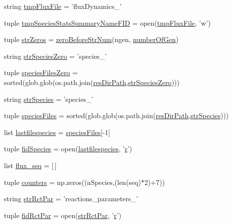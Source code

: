 \begin{DoxyCompactItemize}
\item 
string \hyperlink{a00098_a170166907641e54151f8d83d51420165}{tmp\-Flux\-File} = 'flux\-Dynamics\-\_\-'
\item 
tuple \hyperlink{a00098_a0b5b14621851cbf162c61aa936ca5f2d}{tmp\-Species\-Stats\-Summary\-Name\-F\-I\-D} = open(\hyperlink{a00098_a170166907641e54151f8d83d51420165}{tmp\-Flux\-File}, 'w')
\item 
tuple \hyperlink{a00098_abfa8fbc48a0ad5b6dff6914d6052b2b6}{str\-Zeros} = \hyperlink{a00098_ad40fd27cb36a2086a2b8d0acadd4dbc9}{zero\-Before\-Str\-Num}(ngen, \hyperlink{a00098_acd3059fa3a61438f739193dc80f23b80}{number\-Of\-Gen})
\item 
string \hyperlink{a00098_a658920d97b6df23e672e290d362033b4}{str\-Species\-Zero} = 'species\-\_\-'
\item 
tuple \hyperlink{a00098_a8c18127c32adcc1a3403749a047270e5}{species\-Files\-Zero} = sorted(glob.\-glob(os.\-path.\-join(\hyperlink{a00098_abc625ab1aeed5741a02bbaccfbee5c06}{res\-Dir\-Path},\hyperlink{a00098_a658920d97b6df23e672e290d362033b4}{str\-Species\-Zero})))
\item 
string \hyperlink{a00098_a36518d8de93502466a6d4b2e62eb7734}{str\-Species} = 'species\-\_\-'
\item 
tuple \hyperlink{a00098_ae41c9dafcdeb581e70eeb889d16c6551}{species\-Files} = sorted(glob.\-glob(os.\-path.\-join(\hyperlink{a00098_abc625ab1aeed5741a02bbaccfbee5c06}{res\-Dir\-Path},\hyperlink{a00098_a36518d8de93502466a6d4b2e62eb7734}{str\-Species})))
\item 
list \hyperlink{a00098_a887b4124ed717643d4e79b6d9597109f}{lastfilespecies} = \hyperlink{a00098_ae41c9dafcdeb581e70eeb889d16c6551}{species\-Files}\mbox{[}-\/1\mbox{]}
\item 
tuple \hyperlink{a00098_ad38778cd180f00344e8a8d68511f56fd}{fid\-Species} = open(\hyperlink{a00098_a887b4124ed717643d4e79b6d9597109f}{lastfilespecies}, '\hyperlink{a00031_ac862e7284527eb913b1351c8bfb8e079}{r}')
\item 
list \hyperlink{a00098_a99cfaccf97d11133896704acd137057d}{flux\-\_\-seq} = \mbox{[}$\,$\mbox{]}
\item 
tuple \hyperlink{a00098_ab6476d4caeb73c29cf068374a1c8285d}{counters} = np.\-zeros((n\-Species,(len(seq)$\ast$2)+7))
\item 
string \hyperlink{a00098_ac571c8d78a216f58ebc1e37bef25a541}{str\-Rct\-Par} = 'reactions\-\_\-parameters\-\_\-'
\item 
tuple \hyperlink{a00098_af949c46aab0625cd7bbed10b8a484f8b}{fid\-Rct\-Par} = open(\hyperlink{a00098_ac571c8d78a216f58ebc1e37bef25a541}{str\-Rct\-Par}, '\hyperlink{a00031_ac862e7284527eb913b1351c8bfb8e079}{r}')

\end{DoxyCompactItemize}
